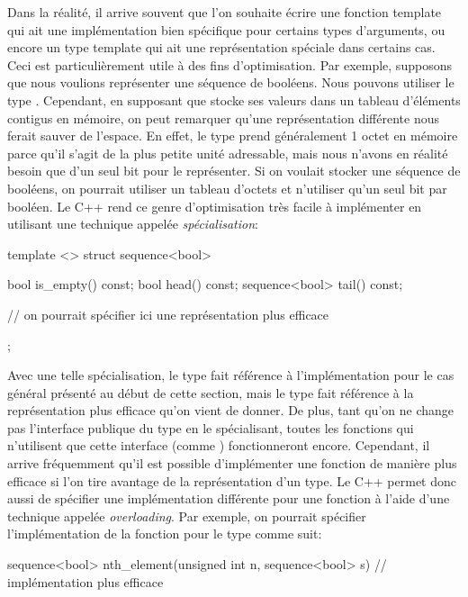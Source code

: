 Dans la réalité, il arrive souvent que l'on souhaite écrire une fonction
template qui ait une implémentation bien spécifique pour certains types
d'arguments, ou encore un type template qui ait une représentation spéciale
dans certains cas. Ceci est particulièrement utile à des fins d'optimisation.
Par exemple, supposons que nous voulions représenter une séquence de booléens.
Nous pouvons utiliser le type . Cependant, en supposant
que  stocke ses valeurs dans un tableau d'éléments contigus en
mémoire, on peut remarquer qu'une représentation différente nous ferait sauver
de l'espace. En effet, le type  prend généralement 1 octet en mémoire
parce qu'il s'agit de la plus petite unité adressable, mais nous n'avons en
réalité besoin que d'un seul bit pour le représenter. Si on voulait stocker
une séquence de booléens, on pourrait utiliser un tableau d'octets et n'utiliser
qu'un seul bit par booléen. Le C++ rend ce genre d'optimisation très facile
à implémenter en utilisant une technique appelée \textit{spécialisation}:
\begin{cpp}
    template <>
    struct sequence<bool> {
        bool is_empty() const;
        bool head() const;
        sequence<bool> tail() const;

        // on pourrait spécifier ici une représentation plus efficace
    };
\end{cpp}

Avec une telle spécialisation, le type  fait référence à
l'implémentation pour le cas général présenté au début de cette section,
mais le type  fait référence à la représentation plus
efficace qu'on vient de donner. De plus, tant qu'on ne change pas l'interface
publique du type  en le spécialisant, toutes les fonctions
qui n'utilisent que cette interface (comme ) fonctionneront
encore. Cependant, il arrive fréquemment qu'il est possible d'implémenter une
fonction de manière plus efficace si l'on tire avantage de la représentation
d'un type. Le C++ permet donc aussi de spécifier une implémentation différente
pour une fonction à l'aide d'une technique appelée \textit{overloading}. Par
exemple, on pourrait spécifier l'implémentation de la fonction
 pour le type  comme suit:
\begin{cpp}
    sequence<bool> nth_element(unsigned int n, sequence<bool> s) {
        // implémentation plus efficace
    }
\end{cpp}

